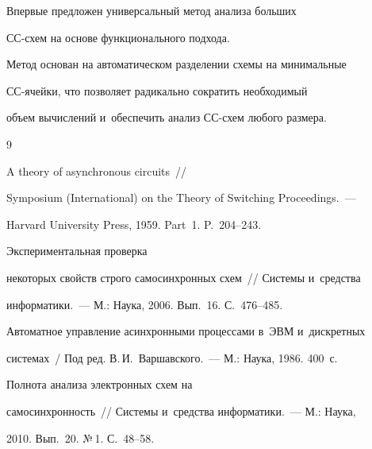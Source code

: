        


   Впервые предложен универсальный метод анализа больших 


СС-схем на основе функционального подхода.


   


   Метод основан на автоматическом разделении схемы на минимальные\linebreak 


СС-ячей\-ки, что позволяет радикально сократить необходимый 


объем вы\-чис\-ле\-ний и~обеспечить анализ СС-схем любого размера.





{\small\frenchspacing


{%




\begin{thebibliography}{9}







 A theory of asynchronous circuits~/\!\!/ 


Symposium (International) on the Theory of Switching Proceedings.~--- 


Harvard University Press, 1959.  Part~1. P.~204--243.




 Экспериментальная проверка 


некоторых свойств строго самосинхронных схем~/\!\!/ Системы и~средства 


информатики.~--- М.: Наука, 2006. Вып.~16. С.~476--485.




Автоматное управление асинхронными процессами в~ЭВМ и~дискретных 


системах~/ Под ред. В.\,И.~Варшавского.~--- М.: Наука, 1986. 400~с.




 Полнота анализа электронных схем на 


самосинхронность~/\!\!/ Системы и~средства информатики.~--- М.: Наука, 


2010. Вып.~20. №\,1. С.~48--58.





\end{thebibliography}}}
